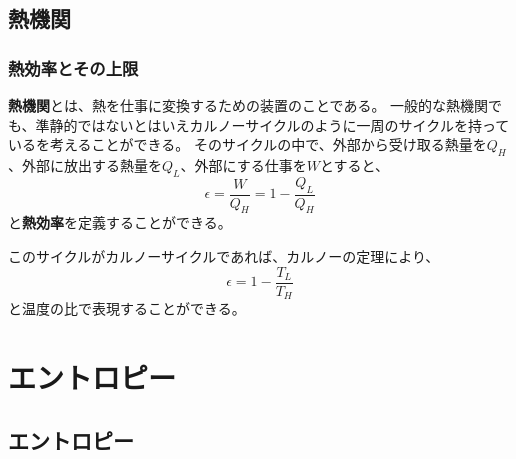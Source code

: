 \documentclass[a4paper]{jsreport}
\begin{document}
        \section{熱機関}    

            \subsection*{熱効率とその上限}
                \textbf{熱機関}とは、熱を仕事に変換するための装置のことである。
                一般的な熱機関でも、準静的ではないとはいえカルノーサイクルのように一周のサイクルを持っているを考えることができる。
                そのサイクルの中で、外部から受け取る熱量を$Q_H$、外部に放出する熱量を$Q_L$、外部にする仕事を$W$とすると、
                \begin{equation}
                    \epsilon = \frac{W}{Q_H} = 1 - \frac{Q_L}{Q_H}
                \end{equation}
                と\textbf{熱効率}を定義することができる。\par
                このサイクルがカルノーサイクルであれば、カルノーの定理により、
                \begin{equation}
                    \epsilon = 1 - \frac{T_L}{T_H}
                \end{equation}
                と温度の比で表現することができる。
    
    \chapter{エントロピー}
        \section{エントロピー}
\end{document}
